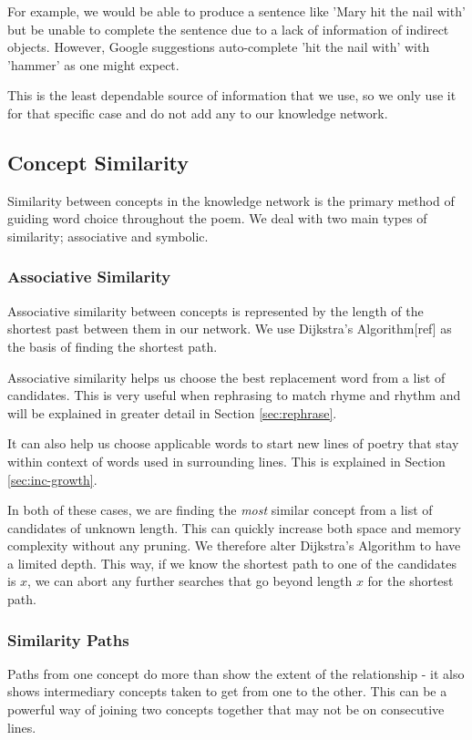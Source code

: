 For example, we would be able to produce a sentence like 'Mary hit the nail with' but be unable to complete the sentence due to a lack of information of indirect objects. However, Google suggestions auto-complete 'hit the nail with' with 'hammer' as one might expect. 

This is the least dependable source of information that we use, so we only use it for that specific case and do not add any to our knowledge network.


\subsection{Concept Similarity}
Similarity between concepts in the knowledge network is the primary method of guiding word choice throughout the poem. We deal with two main types of similarity; associative and symbolic.

\subsubsection{Associative Similarity}
\label{sec:assoc-sim}
Associative similarity between concepts is represented by the length of the shortest past between them in our network. We use Dijkstra's Algorithm[ref] as the basis of finding the shortest path.

Associative similarity helps us choose the best replacement word from a list of candidates. This is very useful when rephrasing to match rhyme and rhythm and will be explained in greater detail in Section \ref{sec:rephrase}. 

It can also help us choose applicable words to start new lines of poetry that stay within context of words used in surrounding lines. This is explained in Section \ref{sec:inc-growth}.

In both of these cases, we are finding the \textit{most} similar concept from a list of candidates of unknown length. This can quickly increase both space and memory complexity without any pruning. We therefore alter Dijkstra's Algorithm to have a limited depth. This way, if we know the shortest path to one of the candidates is $x$, we can abort any further searches that go beyond length $x$ for the shortest path.

\subsubsection{Similarity Paths}
Paths from one concept do more than show the extent of the relationship - it also shows intermediary concepts taken to get from one to the other. This can be a powerful way of joining two concepts together that may not be on consecutive lines.

